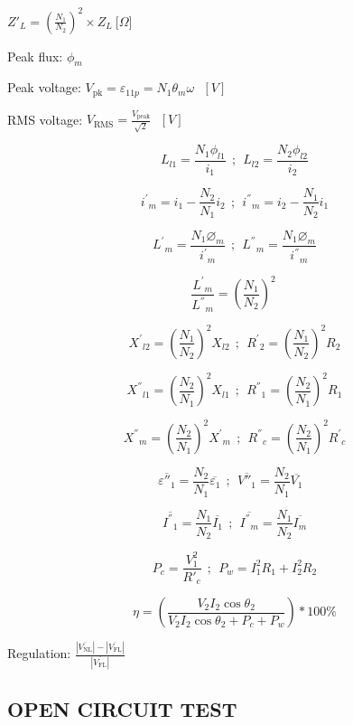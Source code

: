 \begin{multicols}{2}
	\({Z'}_{L} = {(\frac{N_{1}}{N_{2}})}^{2} \times Z_{L}\ \lbrack\Omega\rbrack\)
	
	Peak flux: \(\phi_{m}\)
	
	Peak voltage:
	\(V_{\text{pk}} = \varepsilon_{11p} = N_{1}\theta_{m}\omega\text{\ \ }\left\lbrack V \right\rbrack\)
	
	RMS voltage:
	\(V_{\text{RMS}} = \frac{V_{\text{peak}}}{\sqrt{2}}\text{\ \ }\left\lbrack V \right\rbrack\)
	
	\[L_{l1} = \frac{N_{1}\phi_{l1}}{i_{1}}\ \ ;\ \ L_{l2} = \frac{N_{2}\phi_{l2}}{i_{2}}\]
	
	\[{i^{'}}_{m} = i_{1} - \frac{N_{2}}{N_{1}}i_{2}\ \ ;\ \ {i^{''}}_{m} = i_{2} - \frac{N_{1}}{N_{2}}i_{1}\]
	
	\[{L^{'}}_{m} = \frac{N_{1}\varnothing_{m}}{{i^{'}}_{m}}\ \ ;\ \ {L^{''}}_{m} = \frac{N_{1}\varnothing_{m}}{{i^{''}}_{m}}\]
	
	\[\frac{{L^{'}}_{m}}{{L^{''}}_{m}} = \left( \frac{N_{1}}{N_{2}} \right)^{2}\ \]
	
	\[{X^{'}}_{l2} = \left( \frac{N_{1}}{N_{2}} \right)^{2}X_{l2}\ \ ;\ \ {R^{'}}_{2} = \left( \frac{N_{1}}{N_{2}} \right)^{2}R_{2}\]
	
	\[{X^{''}}_{l1} = \left( \frac{N_{2}}{N_{1}} \right)^{2}X_{l1}\ \ ;\ \ {R^{''}}_{1} = \left( \frac{N_{2}}{N_{1}} \right)^{2}R_{1}\]
	
	\[{X^{''}}_{m} = \left( \frac{N_{2}}{N_{1}} \right)^{2}{X^{'}}_{m}\ \ ;\ \ {R^{''}}_{c} = \left( \frac{N_{2}}{N_{1}} \right)^{2}{R^{'}}_{c}\]
	
	\[\overline{{\varepsilon''}_{1}} = \frac{N_{2}}{N_{1}}\overline{\varepsilon_{1}}\ \ ;\ \ \overline{{V''}_{1}} = \frac{N_{2}}{N_{1}}\overline{V_{1}}\text{\ \ }\]
	
	\[\overline{{I^{''}}_{1}} = \frac{N_{1}}{N_{2}}\overline{I_{1}}\ \ ;\ \ \overline{{I^{''}}_{m}} = \frac{N_{1}}{N_{2}}\overline{I_{m}}\]
	
	\[P_{c} = \frac{V_{1}^{2}}{{R'}_{c}}\ \ ;\ \ P_{w} = I_{1}^{2}R_{1} + I_{2}^{2}R_{2}\]
	
	\[\eta = \left( \frac{V_{2}I_{2}\cos\theta_{2}}{V_{2}I_{2}\cos{\theta_{2} + P_{c} + P_{w}}} \right)*100\%\]
	
	Regulation:
	\(\frac{\left| \overline{V_{\text{NL}}} \right| - \left| \overline{V_{\text{FL}}} \right|}{\left| \overline{V_{\text{FL}}} \right|}\)
	
	\subsection{OPEN CIRCUIT TEST}
	

\end{multicols}
